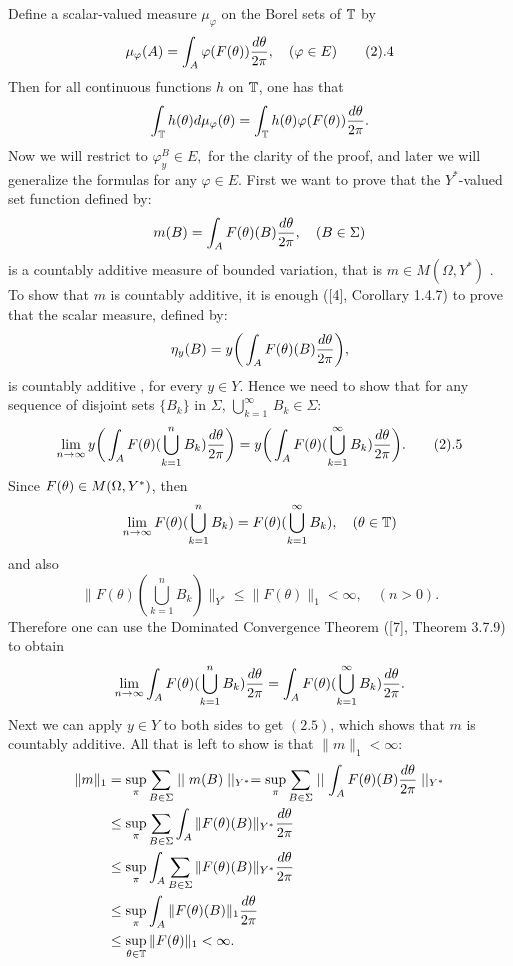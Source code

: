   Define a scalar-valued measure $\mu_{\varphi}$ on the Borel sets
of $\Bbb T$ by
$$\mu_{\varphi}(A) = \int_A \varphi(F(\theta))
{{d\theta}\over{2\pi}}, \quad (\varphi \in E) \tag2.4$$
Then for all continuous functions $h$ on $\Bbb T$, one has that
$$\int_{\Bbb T} h(\theta) d\mu_{\varphi} (\theta) = \int_{\Bbb T} h(\theta)
\varphi(F(\theta)) {{d\theta}\over{2\pi}}.$$
   Now we will restrict to  $\varphi_y^B \in E,$ for the clarity of
the proof,
and later we will generalize the formulas for any $\varphi \in E$.
    First we want to prove that the $Y^*$-valued set function defined by:
 $$m(B)=\int_A F(\theta)(B) {{ d\theta}\over{2\pi}},\quad (B \in\Sigma)$$
is a countably additive measure of bounded variation, that is $m\in
M(\Omega, Y^*)$  .
To show that $m$ is countably additive, it is enough ([4],
Corollary 1.4.7) to
prove that
the scalar measure, defined by:
$$ \eta_y(B)= y\bigg(\int_A F(\theta)(B) {{d\theta}\over{2\pi}}\bigg), $$
 is countably additive , for every $y\in Y$.
Hence we need to show that for any sequence of disjoint sets
$\{B_k\}$ in $\Sigma$, $\bigcup_{k=1}^{\infty} \,B_k \in \Sigma$:
$$ \lim_{n\to \infty} y\bigg(\int_A F(\theta)( \bigcup_{k=1}^n  B_k)
{{d\theta}\over{2\pi}}\bigg) = y\bigg(\int_A
F(\theta)(\bigcup_{k=1}^{\infty}  B_k)
{{d\theta}\over{2\pi}}\bigg).\tag2.5$$
 Since $F(\theta) \in M(\Omega, Y^*)$, then
$$\lim_{n\to \infty} F(\theta)(\bigcup_{k=1}^{n}  B_k) =
   F(\theta)(\bigcup_{k=1}^{\infty}  B_k),\quad ( \theta \in \Bbb T)$$
and  also
$$\|F(\theta)(\bigcup_{k=1}^{n}  B_k) \|_{Y^*} \le
  \|F(\theta)\|_1 < \infty, \quad  (n>0). $$
Therefore one can use the Dominated Convergence Theorem ([7],
Theorem 3.7.9) to
obtain
$$\lim_{n\to \infty} \int_A F(\theta)( \bigcup_{k=1}^n  B_k)
{{d\theta}\over{2\pi}} = \int_A F(\theta)(\bigcup_{k=1}^{\infty}  B_k)
{{d\theta}\over{2\pi}}.$$
Next we can apply $y\in Y$ to both sides to get $(2.5)$, which
shows that $m$ is countably additive.
All that is left to show is that $\|m\|_1< \infty$:
$$\split \|m\|_1 &= \sup_{\pi} \sum_{B\in\Sigma}\mid\mid
m(B)\mid\mid_{Y^*} =
\sup_{\pi} \sum_{B\in\Sigma}\mid\mid \int_A
F(\theta)(B){{d\theta}\over{2\pi}}\mid\mid_{Y^*}\\
& \le
\sup_{\pi} \sum_{B\in\Sigma} \int_A
\|F(\theta)(B)\|_{Y^*}{{d\theta}\over{2\pi}} \\
&\le\sup_{\pi}  \int_A \sum_{B\in\Sigma}
\|F(\theta)(B)\|_{Y^*}{{d\theta}\over{2\pi}}\\
 & \le
\sup_{\pi}  \int_A  \|F(\theta)(B)\|_{1}{{d\theta}\over{2\pi}}\\
& \le\sup_{\theta \in \T}  \|F(\theta)\|_1 <\infty .\endsplit   $$
